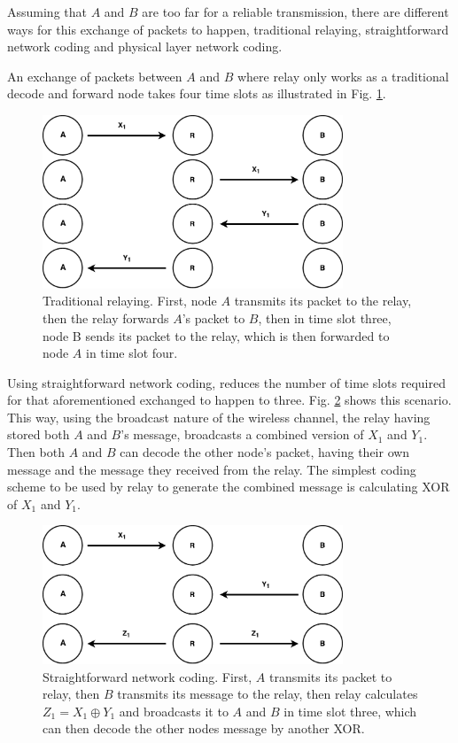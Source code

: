 Assuming that $A$ and $B$ are too far for a reliable transmission, there are different ways for this exchange of packets to happen, traditional relaying, straightforward network coding and physical layer network coding.

An exchange of packets between $A$ and $B$ where relay only works as a traditional decode and forward node takes four time slots as illustrated in Fig. \ref{fig:traditionalRelay}.  

\begin{figure} [th]
    \centering
    \includegraphics[width=0.8\textwidth]{figures/traditionalRelay.pdf}
    \caption{Traditional relaying. First, node $A$ transmits its packet to the relay, then the relay forwards $A$'s packet to $B$, then in time slot three, node B sends its packet to the relay, which is then forwarded to node $A$ in time slot four.} \label{fig:traditionalRelay}
\end{figure}

Using straightforward network coding, reduces the number of time slots required for that aforementioned exchanged to happen to three. Fig. \ref{fig:straightforwardNC} shows this scenario. This way, using the broadcast nature of the wireless channel, the relay having stored both $A$ and $B$'s message, broadcasts a combined version of $X_1$ and $Y_1$. Then both $A$ and $B$ can decode the other node's packet, having their own message and the message they received from the relay. The simplest coding scheme to be used by relay to generate the combined message is calculating XOR of  $X_1$ and $Y_1$.

\begin{figure} [th]
    \centering
    \includegraphics[width=0.8\textwidth]{figures/straightforwardNC.pdf}
    \caption{Straightforward network coding. First, $A$ transmits its packet to relay, then $B$ transmits its message to the relay, then relay calculates $Z_1=X_1 \oplus Y_1$ and broadcasts it to $A$ and $B$ in time slot three, which can then decode the other nodes message by another XOR.} \label{fig:straightforwardNC}
\end{figure}

